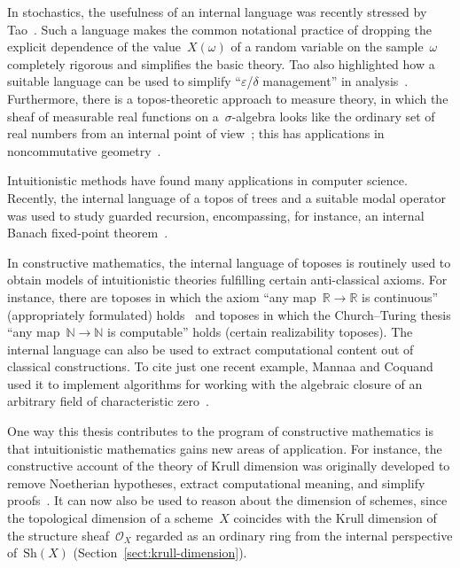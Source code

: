 \documentclass[10pt,reqno,a4paper]{amsbook}
\theoremstyle{definition}
\theoremstyle{plain}
\theoremstyle{remark}
\renewcommand{\O}{\mathcal{O}}
\newcommand{\NN}{\mathbb{N}}
\newcommand{\RR}{\mathbb{R}}
\newcommand{\Sh}{\mathrm{Sh}}
\newcommand{\?}{\,{:}\,}
\renewcommand{\_}{\mathpunct{.}\,}
\begin{document}
{In stochastics, the usefulness of an internal language was recently stressed by
Tao~\cite{tao:analysis-rel-measure-space}. Such a language makes the
common notational practice of dropping the explicit dependence of the
value~$X(\omega)$ of a random variable on the sample~$\omega$ completely
rigorous and simplifies the basic theory. Tao also highlighted how a suitable
language can be used to simplify ``$\varepsilon$/$\delta$ management'' in
analysis~\cite{tao:cheap-nsa}. Furthermore, there is a topos-theoretic approach to
measure theory, in which the sheaf of measurable real functions on
a~$\sigma$-algebra looks like the ordinary set of real numbers from an internal point
of view~\cite{jackson:sheaf-theoretic-measure-theory}; this has applications in
noncommutative geometry~\cite{henry:measure-theory-boolean-toposes}.

Intuitionistic methods have found many applications in computer science.
Recently, the internal language of a topos of trees and a suitable modal
operator was used to study guarded recursion, encompassing, for instance, an
internal Banach fixed-point theorem~\cite{birkedal:al:sgdt}.

In constructive mathematics, the internal language of toposes is routinely used
to obtain models of intuitionistic theories fulfilling certain anti-classical
axioms. For instance, there are toposes in which the axiom ``any map~$\RR \to
\RR$ is continuous'' (appropriately formulated) holds~\cite{kock:sdg,moerdijk:reyes:models}
and toposes in which the Church--Turing thesis ``any map~$\NN \to \NN$ is
computable'' holds (certain realizability toposes).
The internal language can also be used to extract computational content
out of classical constructions. To cite just one recent example, Mannaa and
Coquand used it to implement algorithms for working with the algebraic closure
of an arbitrary field of characteristic zero~\cite{mannaa:coquand:alg-closure}.

One way this thesis contributes to the program of constructive
mathematics is that intuitionistic mathematics gains new areas of application.
For instance, the constructive account of the theory of Krull dimension was
originally developed to remove Noetherian hypotheses, extract computational meaning, and
simplify proofs~\cite{dyn:krull-integral,dyn:char-krull}. It can now also be used to
reason about the dimension of schemes, since the topological dimension of a
scheme~$X$ coincides with the Krull dimension of the structure sheaf~$\O_X$
regarded as an ordinary ring from the internal perspective of~$\Sh(X)$
(Section~\ref{sect:krull-dimension}).

}
\end{document}
